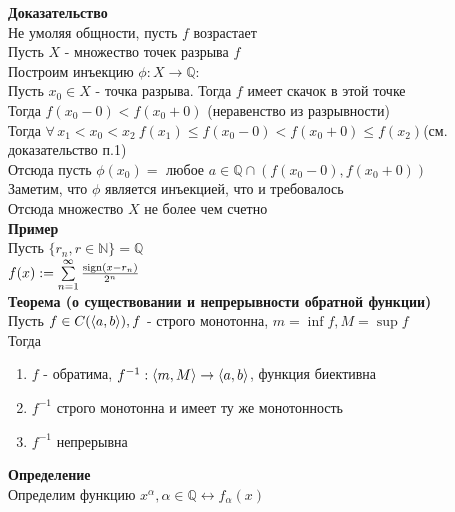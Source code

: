 \documentclass[12pt]{article}
\begin{document}
\textbf{Доказательство}\\
Не умоляя общности, пусть $f$ возрастает\\
Пусть $X$ - множество точек разрыва $f$\\
Построим инъекцию $\phi: X \rightarrow \mathbb{Q}$:\\
Пусть $x_0 \in X$ - точка разрыва. Тогда $f$ имеет скачок в этой точке\\
Тогда $f(x_0-0) < f(x_0+0)$ (неравенство из разрывности)\\
Тогда $\forall\,x_1<x_0<x_2\ f(x_1) \leq f(x_0-0) < f(x_0+0) \leq f(x_2)$(см. доказательство п.1)\\
Отсюда пусть $\phi(x_0) = $ любое $a \in \mathbb{Q} \cap (f(x_0-0), f(x_0+0))$\\
Заметим, что $\phi$ является инъекцией, что и требовалось\\
Отсюда множество $X$ не более чем счетно\\
\textbf{Пример}\\
Пусть $\{r_n, r\in \mathbb{N}\} = \mathbb{Q}$\\
$f(x) := \sum\limits_{n=1}^\infty \frac{\operatorname{sign}(x-r_n)}{2^n}$\\
\textbf{Теорема (о существовании и непрерывности обратной функции)}\\
Пусть $f \in C(\langle a, b \rangle), f$ - строго монотонна, $m = \inf f, M = \sup f$\\
Тогда
\begin{enumerate}
    \item $f$ - обратима, $f^{-1}: \langle m, M\rangle \rightarrow \langle a, b \rangle$, функция биективна 
    \item $f^{-1}$ строго монотонна и имеет ту же монотонность
    \item $f^{-1}$ непрерывна
\end{enumerate}
\textbf{Определение}\\
Определим функцию $x^\alpha, \alpha \in \mathbb{Q} \leftrightarrow f_\alpha(x)$
\end{document}
